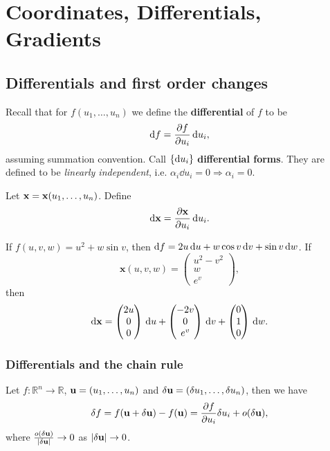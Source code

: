 \section{Coordinates, Differentials, Gradients}
\subsection{Differentials and first order changes}

Recall that for $ f(u_1,\dots,u_n) $ we define the \textbf{differential} of $f$ to be 
\[
    \mathrm{d} f = \frac{\partial f}{\partial u_i} \,\mathrm{d} u_i, 
\]
assuming summation convention. Call $ \{\mathrm{d} u_i\} $ \textbf{differential forms}. They are defined to be \textit{linearly independent}, i.e. $ \alpha_i \dd u_i =0 \Rightarrow \alpha_i=0 $.
\begin{definition}
    Let ${\bf x} = {\bf x}(u_1,\dots,u_n)$. Define
    \[
        \mathrm{d} {\bf x}= \frac{\partial {\bf x}}{\partial u_i} \,\mathrm{d} u_i. 
    \]
\end{definition}

\begin{example}
    If $f(u,v,w)=u^2+w\sin v$, then $ \mathrm{d} f = 2u\,\mathrm{d} u+w \cos v \,\mathrm{d} v+ \sin v \,\mathrm{d} w $. If 
    \[
        \mathbf{x}(u,v,w)=\begin{pmatrix}
            u^2-v^2 \\ w \\ e^v
        \end{pmatrix},
    \] 
    then 
    \[
        \mathrm{d} \mathbf{x} = \begin{pmatrix}
            2u \\ 0 \\ 0
        \end{pmatrix}\,\mathrm{d} u+ \begin{pmatrix}
            -2v \\ 0 \\ e^v
        \end{pmatrix}\,\mathrm{d} v+\begin{pmatrix}
            0 \\ 1 \\ 0
        \end{pmatrix}\,\mathrm{d} w.
    \]
\end{example}

\subsubsection{Differentials and the chain rule}
Let $ f: \mathbb{R}^{n}\to \mathbb{R} $, ${\bf u}=(u_1,\dots,u_n)$ and $ \delta{\bf u}=(\delta u_1,\dots,\delta u_n) $, then we have 
\[
    \delta f=f({\bf u}+\delta{\bf u})-f({\bf u})=\frac{\partial f}{\partial u_i}\delta u_i +o(\delta{\bf u}),
\]
where $ \frac{o(\delta{\bf u})}{|\delta{\bf u}|}\to 0 $ as $ |\delta{\bf u}|\to 0 $.

